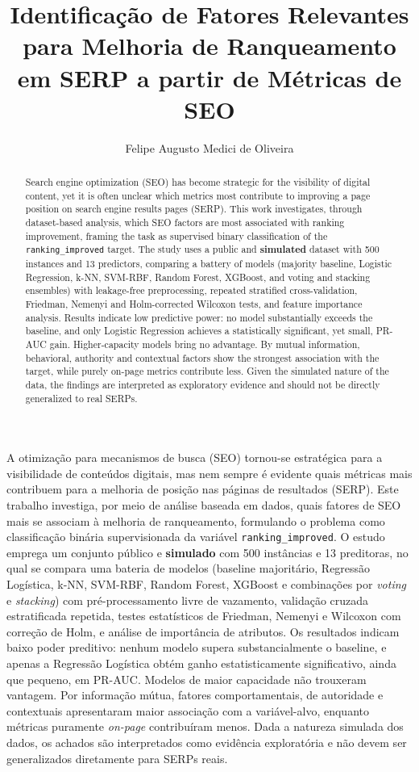 \documentclass[12pt]{article}
\title{Identificação de Fatores Relevantes para Melhoria de Ranqueamento em SERP a partir de Métricas de SEO}
\author{Felipe Augusto Medici de Oliveira\inst{1}}
\begin{document}
\maketitle

\begin{resumo}
A otimização para mecanismos de busca (SEO) tornou-se estratégica para a visibilidade
de conteúdos digitais, mas nem sempre é evidente quais métricas mais contribuem para a
melhoria de posição nas páginas de resultados (SERP). Este trabalho investiga, por meio de
análise baseada em dados, quais fatores de SEO mais se associam à melhoria de ranqueamento,
formulando o problema como classificação binária supervisionada da variável
\texttt{ranking\_improved}. O estudo emprega um conjunto público e \textbf{simulado} com 500
instâncias e 13 preditoras, no qual se compara uma bateria de modelos (baseline majoritário,
Regressão Logística, k-NN, SVM-RBF, Random Forest, XGBoost e combinações por \textit{voting} e
\textit{stacking}) com pré-processamento livre de vazamento, validação cruzada estratificada
repetida, testes estatísticos de Friedman, Nemenyi e Wilcoxon com correção de Holm, e análise
de importância de atributos. Os resultados indicam baixo poder preditivo: nenhum modelo supera
substancialmente o baseline, e apenas a Regressão Logística obtém ganho estatisticamente
significativo, ainda que pequeno, em PR-AUC. Modelos de maior capacidade não trouxeram
vantagem. Por informação mútua, fatores comportamentais, de autoridade e contextuais
apresentaram maior associação com a variável-alvo, enquanto métricas puramente \textit{on-page}
contribuíram menos. Dada a natureza simulada dos dados, os achados são interpretados como
evidência exploratória e não devem ser generalizados diretamente para SERPs reais.
\end{resumo}

\begin{abstract}
Search engine optimization (SEO) has become strategic for the visibility of digital content,
yet it is often unclear which metrics most contribute to improving a page position on search
engine results pages (SERP). This work investigates, through dataset-based analysis, which SEO
factors are most associated with ranking improvement, framing the task as supervised binary
classification of the \texttt{ranking\_improved} target. The study uses a public and
\textbf{simulated} dataset with 500 instances and 13 predictors, comparing a battery of models
(majority baseline, Logistic Regression, k-NN, SVM-RBF, Random Forest, XGBoost, and voting and
stacking ensembles) with leakage-free preprocessing, repeated stratified cross-validation,
Friedman, Nemenyi and Holm-corrected Wilcoxon tests, and feature importance analysis. Results
indicate low predictive power: no model substantially exceeds the baseline, and only Logistic
Regression achieves a statistically significant, yet small, PR-AUC gain. Higher-capacity models
bring no advantage. By mutual information, behavioral, authority and contextual factors show the
strongest association with the target, while purely on-page metrics contribute less. Given the
simulated nature of the data, the findings are interpreted as exploratory evidence and should
not be directly generalized to real SERPs.
\end{abstract}
\end{document}
